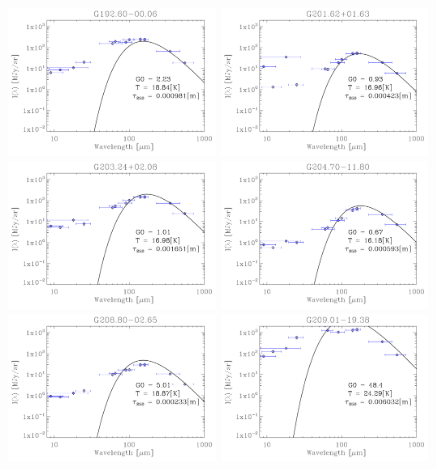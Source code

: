 \begin{figure}
\includegraphics[trim=-1mm -1mm -1mm -1mm, clip, width=55mm]{appB/appB_48.pdf}
\includegraphics[trim=-1mm -1mm -1mm -1mm, clip, width=55mm]{appB/appB_49.pdf}
\includegraphics[trim=-1mm -1mm -1mm -1mm, clip, width=55mm]{appB/appB_50.pdf}
\includegraphics[trim=-1mm -1mm -1mm -1mm, clip, width=55mm]{appB/appB_51.pdf}
\includegraphics[trim=-1mm -1mm -1mm -1mm, clip, width=55mm]{appB/appB_52.pdf}
\includegraphics[trim=-1mm -1mm -1mm -1mm, clip, width=55mm]{appB/appB_53.pdf}
\end{figure}

